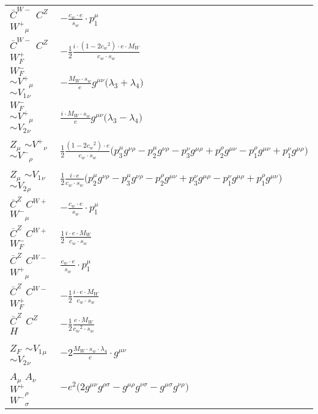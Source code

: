\begin{center}
\begin{tabular}{|l|l|}
$\bar{C}^{W-}{}_{}$ \phantom{-} $C^{Z}{}_{}$ \phantom{-} $W^+{}_{\mu }$ \phantom{-}  &
	$-\frac{ c_w \cdot e}{ s_w}\cdot p_1^\mu $\\[2mm]
$\bar{C}^{W-}{}_{}$ \phantom{-} $C^{Z}{}_{}$ \phantom{-} $W^+_F{}_{}$ \phantom{-}  &
	$-\frac{1}{2}\frac{ i \cdot (1-2 c_w {}^2) \cdot e \cdot M_W}{ c_w \cdot s_w}$\\[2mm]
$W^-_F{}_{}$ \phantom{-} $\sim V^+{}_{\mu }$ \phantom{-} $\sim V_1{}_{\nu }$ \phantom{-}  &
	$-\frac{ M_W \cdot s_w}{ e}g^{\mu \nu} \big( \lambda_3+ \lambda_4\big)$\\[2mm]
$W^-_F{}_{}$ \phantom{-} $\sim V^+{}_{\mu }$ \phantom{-} $\sim V_2{}_{\nu }$ \phantom{-}  &
	$\frac{ i \cdot M_W \cdot s_w}{ e}g^{\mu \nu} \big( \lambda_3- \lambda_4\big)$\\[2mm]
${Z}_{\mu }$ \phantom{-} $\sim V^+{}_{\nu }$ \phantom{-} $\sim V^-{}_{\rho }$ \phantom{-}  &
	$\frac{1}{2}\frac{ (1-2 c_w {}^2) \cdot e}{ c_w \cdot s_w}\big(p_3^\mu g^{\nu \rho} -p_2^\mu g^{\nu \rho} -p_3^\nu g^{\mu \rho} +p_2^\rho g^{\mu \nu} -p_1^\rho g^{\mu \nu} +p_1^\nu g^{\mu \rho} \big)$\\[2mm]
${Z}_{\mu }$ \phantom{-} $\sim V_1{}_{\nu }$ \phantom{-} $\sim V_2{}_{\rho }$ \phantom{-}  &
	$\frac{1}{2}\frac{ i \cdot e}{ c_w \cdot s_w}\big(p_2^\mu g^{\nu \rho} -p_3^\mu g^{\nu \rho} -p_2^\rho g^{\mu \nu} +p_3^\nu g^{\mu \rho} -p_1^\nu g^{\mu \rho} +p_1^\rho g^{\mu \nu} \big)$\\[2mm]
$\bar{C}^{Z}{}_{}$ \phantom{-} $C^{W+}{}_{}$ \phantom{-} $W^-{}_{\mu }$ \phantom{-}  &
	$-\frac{ c_w \cdot e}{ s_w}\cdot p_1^\mu $\\[2mm]
$\bar{C}^{Z}{}_{}$ \phantom{-} $C^{W+}{}_{}$ \phantom{-} $W^-_F{}_{}$ \phantom{-}  &
	$\frac{1}{2}\frac{ i \cdot e \cdot M_W}{ c_w \cdot s_w}$\\[2mm]
$\bar{C}^{Z}{}_{}$ \phantom{-} $C^{W-}{}_{}$ \phantom{-} $W^+{}_{\mu }$ \phantom{-}  &
	$\frac{ c_w \cdot e}{ s_w}\cdot p_1^\mu $\\[2mm]
$\bar{C}^{Z}{}_{}$ \phantom{-} $C^{W-}{}_{}$ \phantom{-} $W^+_F{}_{}$ \phantom{-}  &
	$-\frac{1}{2}\frac{ i \cdot e \cdot M_W}{ c_w \cdot s_w}$\\[2mm]
$\bar{C}^{Z}{}_{}$ \phantom{-} $C^{Z}{}_{}$ \phantom{-} ${H}_{}$ \phantom{-}  &
	$-\frac{1}{2}\frac{ e \cdot M_W}{ c_w{}^2  \cdot s_w}$\\[2mm]
$Z_F{}_{}$ \phantom{-} $\sim V_1{}_{\mu }$ \phantom{-} $\sim V_2{}_{\nu }$ \phantom{-}  &
	$-2\frac{ M_W \cdot s_w \cdot \lambda_4}{ e}\cdot g^{\mu \nu} $\\[2mm]
${A}_{\mu }$ \phantom{-} ${A}_{\nu }$ \phantom{-} $W^+{}_{\rho }$ \phantom{-} $W^-{}_{\sigma }$ \phantom{-}  &
	$- e{}^2 \big(2g^{\mu \nu} g^{\rho \sigma} -g^{\mu \rho} g^{\nu \sigma} -g^{\mu \sigma} g^{\nu \rho} \big)$\\ \hline
\end{tabular}


\end{center}
